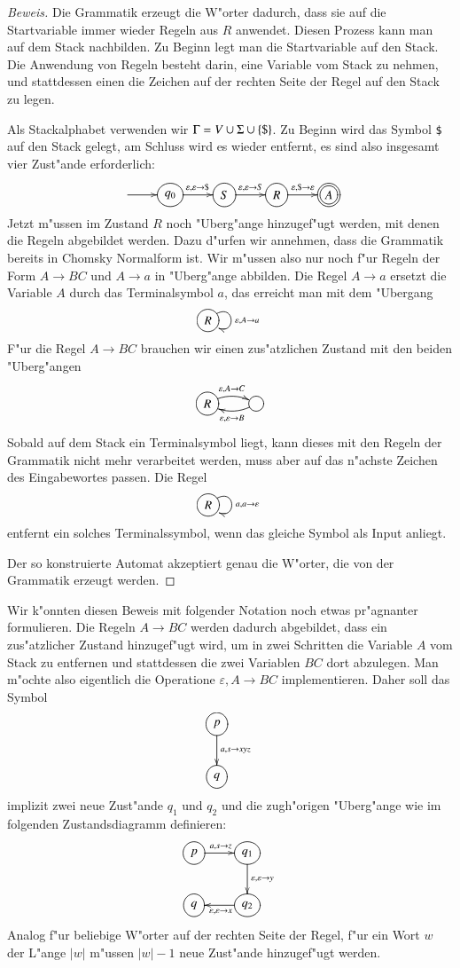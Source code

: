 \begin{proof}[Beweis]
Die Grammatik erzeugt die W"orter dadurch, dass sie auf die Startvariable
immer wieder Regeln aus $R$ anwendet. Diesen Prozess kann man auf dem
Stack nachbilden. Zu Beginn legt man die Startvariable auf den Stack.
Die Anwendung von Regeln besteht darin, eine Variable vom Stack zu nehmen,
und stattdessen einen die Zeichen auf der rechten Seite der Regel
auf den Stack zu legen. 

Als Stackalphabet verwenden wir $\Gamma = V\cup \Sigma \cup \{{\tt \$}\}$.
Zu Beginn wird das Symbol {\tt\$} auf den Stack gelegt, am Schluss wird 
es wieder entfernt, es sind also insgesamt vier Zust"ande erforderlich:
\[
\entrymodifiers={++[o][F]}
\xymatrix{
*+\txt{}\ar[r]
	&{q_0} \ar[r]^{\varepsilon,\varepsilon\to{\tt\$}}
		&{S}\ar[r]^{\varepsilon,\varepsilon\to S}
			&{R}\ar[r]^{\varepsilon,{\tt\$}\to\varepsilon}
				&*++[o][F=]{A}
}
\]
Jetzt m"ussen im Zustand $R$ noch "Uberg"ange hinzugef"ugt werden, mit denen
die Regeln abgebildet werden.
Dazu d"urfen wir annehmen, dass die Grammatik bereits in Chomsky Normalform
ist. Wir m"ussen also nur noch f"ur Regeln der Form $A\to BC$ und $A\to a$
in "Uberg"ange abbilden. Die Regel $A\to a$ ersetzt die Variable $A$
durch das Terminalsymbol $a$, das erreicht man mit dem "Ubergang
\[
\entrymodifiers={++[o][F]}
\xymatrix{
{R}\ar@(ur,dr)^{\varepsilon,A\to a}
}
\]
F"ur die Regel $A\to BC$ brauchen wir einen zus"atzlichen Zustand mit
den beiden "Uberg"angen
\[
\entrymodifiers={++[o][F]}
\xymatrix{
R\ar@/^/[r]^{\varepsilon,A\to C}
	&{}\ar@/^/[l]^{\varepsilon,\varepsilon\to B}
}
\]
Sobald auf dem Stack ein Terminalsymbol liegt, kann dieses mit
den Regeln der Grammatik nicht mehr verarbeitet werden, muss 
aber auf das n"achste Zeichen des Eingabewortes passen. Die Regel
\[
\entrymodifiers={++[o][F]}
\xymatrix{
{R}\ar@(ur,dr)^{a,a\to\varepsilon}
}
\]
entfernt ein solches Terminalssymbol, wenn das gleiche Symbol
als Input anliegt.

Der so konstruierte Automat akzeptiert genau die
W"orter, die von der Grammatik erzeugt werden.
\end{proof}

Wir k"onnten diesen Beweis mit folgender Notation noch etwas
pr"agnanter formulieren. Die Regeln $A\to BC$ werden dadurch abgebildet,
dass ein zus"atzlicher Zustand hinzugef"ugt wird, um in zwei Schritten
die Variable $A$ vom Stack zu entfernen und stattdessen die zwei Variablen
$BC$ dort abzulegen. Man m"ochte also eigentlich die Operatione
$\varepsilon,A\to BC$ implementieren. Daher soll das Symbol
\[
\entrymodifiers={++[o][F]}
\xymatrix{
{p}\ar[d]^{a,s\to xyz}
\\
{q}
}
\]
implizit zwei neue Zust"ande $q_1$ und $q_2$ und die zugh"origen
"Uberg"ange wie im folgenden Zustandsdiagramm definieren:
\[
\entrymodifiers={++[o][F]}
\xymatrix{
{p}\ar[r]^{a,s\to z}
	&{q_1}\ar[d]^{\varepsilon,\varepsilon\to y}
\\
{q}
	&{q_2}\ar[l]^{\varepsilon,\varepsilon\to x}
}
\]
Analog f"ur beliebige W"orter auf der rechten Seite der Regel,
f"ur ein Wort $w$ der L"ange $|w|$ m"ussen $|w|-1$ neue
Zust"ande hinzugef"ugt werden.

